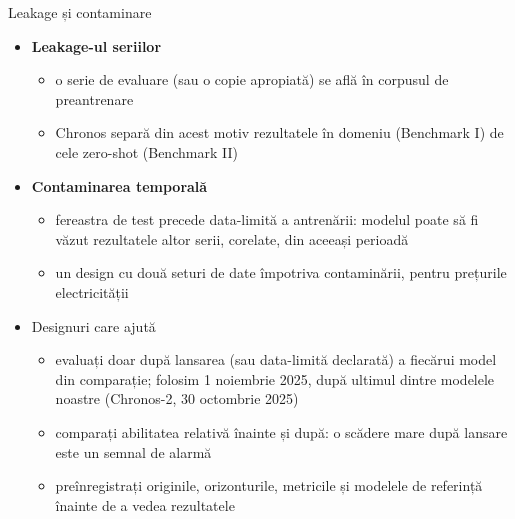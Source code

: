 \begin{frame}{Leakage și contaminare}
\itemsize{\small}
\begin{itemize}
    \item \textbf{Leakage-ul seriilor}
    \begin{itemize}
        \item o serie de evaluare (sau o copie apropiată) se află în corpusul de preantrenare
        \item Chronos separă din acest motiv rezultatele în domeniu (Benchmark I) de cele zero-shot (Benchmark II) 
    \end{itemize}
    \item \textbf{Contaminarea temporală}
    \begin{itemize}
        \item fereastra de test precede data-limită a antrenării: modelul poate să fi văzut rezultatele altor serii, corelate, din aceeași perioadă
        \item un design cu două seturi de date împotriva contaminării, pentru prețurile electricității 
    \end{itemize}
    \item Designuri care ajută
    \begin{itemize}
        \item evaluați doar după lansarea (sau data-limită declarată) a fiecărui model din comparație; folosim 1 noiembrie 2025, după ultimul dintre modelele noastre (Chronos-2, 30 octombrie 2025)
        \item comparați abilitatea relativă înainte și după: o scădere mare după lansare este un semnal de alarmă
        \item preînregistrați originile, orizonturile, metricile și modelele de referință înainte de a vedea rezultatele
    \end{itemize}
\end{itemize}
\end{frame}

